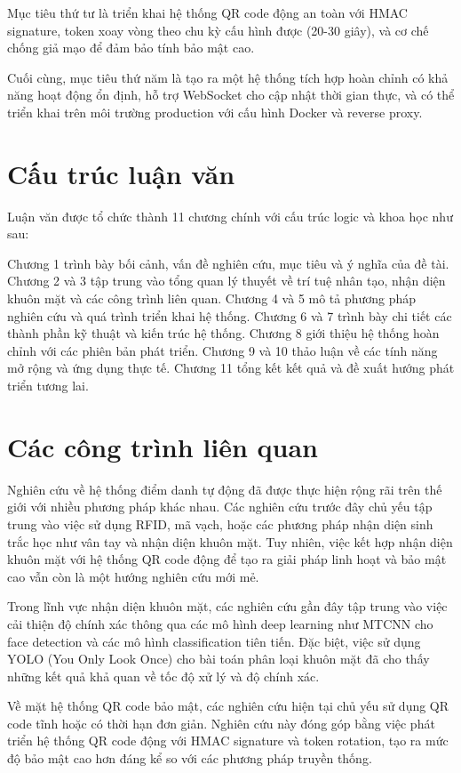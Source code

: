 \documentclass[12pt,a4paper]{report}
\begin{document}
Mục tiêu thứ tư là triển khai hệ thống QR code động an toàn với HMAC signature, token xoay vòng theo chu kỳ cấu hình được (20-30 giây), và cơ chế chống giả mạo để đảm bảo tính bảo mật cao.

Cuối cùng, mục tiêu thứ năm là tạo ra một hệ thống tích hợp hoàn chỉnh có khả năng hoạt động ổn định, hỗ trợ WebSocket cho cập nhật thời gian thực, và có thể triển khai trên môi trường production với cấu hình Docker và reverse proxy.

\section{Cấu trúc luận văn}
Luận văn được tổ chức thành 11 chương chính với cấu trúc logic và khoa học như sau:

Chương 1 trình bày bối cảnh, vấn đề nghiên cứu, mục tiêu và ý nghĩa của đề tài. Chương 2 và 3 tập trung vào tổng quan lý thuyết về trí tuệ nhân tạo, nhận diện khuôn mặt và các công trình liên quan. Chương 4 và 5 mô tả phương pháp nghiên cứu và quá trình triển khai hệ thống. Chương 6 và 7 trình bày chi tiết các thành phần kỹ thuật và kiến trúc hệ thống. Chương 8 giới thiệu hệ thống hoàn chỉnh với các phiên bản phát triển. Chương 9 và 10 thảo luận về các tính năng mở rộng và ứng dụng thực tế. Chương 11 tổng kết kết quả và đề xuất hướng phát triển tương lai.

\section{Các công trình liên quan}
Nghiên cứu về hệ thống điểm danh tự động đã được thực hiện rộng rãi trên thế giới với nhiều phương pháp khác nhau. Các nghiên cứu trước đây chủ yếu tập trung vào việc sử dụng RFID, mã vạch, hoặc các phương pháp nhận diện sinh trắc học như vân tay và nhận diện khuôn mặt. Tuy nhiên, việc kết hợp nhận diện khuôn mặt với hệ thống QR code động để tạo ra giải pháp linh hoạt và bảo mật cao vẫn còn là một hướng nghiên cứu mới mẻ.

Trong lĩnh vực nhận diện khuôn mặt, các nghiên cứu gần đây tập trung vào việc cải thiện độ chính xác thông qua các mô hình deep learning như MTCNN cho face detection và các mô hình classification tiên tiến. Đặc biệt, việc sử dụng YOLO (You Only Look Once) cho bài toán phân loại khuôn mặt đã cho thấy những kết quả khả quan về tốc độ xử lý và độ chính xác.

Về mặt hệ thống QR code bảo mật, các nghiên cứu hiện tại chủ yếu sử dụng QR code tĩnh hoặc có thời hạn đơn giản. Nghiên cứu này đóng góp bằng việc phát triển hệ thống QR code động với HMAC signature và token rotation, tạo ra mức độ bảo mật cao hơn đáng kể so với các phương pháp truyền thống.
\end{document}
